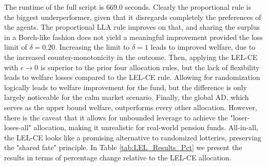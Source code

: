 The runtime of the full script is 669.0 seconds. Clearly the proportional rule is the biggest underperformer, given that it disregards completely the preferences of the agents. The proportional LLA rule improves on that, and sharing the surplus in a Borch-like fashion does not yield a meaningful improvement provided the loss limit of $\delta = 0.20$. Increasing the limit to $\delta = 1$ leads to improved welfare, due to the increased counter-monotonicity in the outcome. Then, applying the LEL-CE with $\epsilon \to 0$ is superior to the prior four allocation rules, but the lack of flexibility leads to welfare losses compared to the LEL-CE rule. Allowing for randomization logically leads to welfare improvement for the fund, but the difference is only largely noticeable for the calm market scenario. Finally, the global AD, which serves as the upper bound welfare, outperforms every other allocation. However, there is the caveat that it allows for unbounded leverage to achieve the "loser-loses-all" allocation, making it unrealistic for real-world pension funds. All-in-all, the LEL-CE looks like a promising alternative to randomized lotteries, preserving the "shared fate" principle. In Table \ref{tab:LEL_Results_Pct} we present the results in terms of percentage change relative to the LEL-CE allocation.
